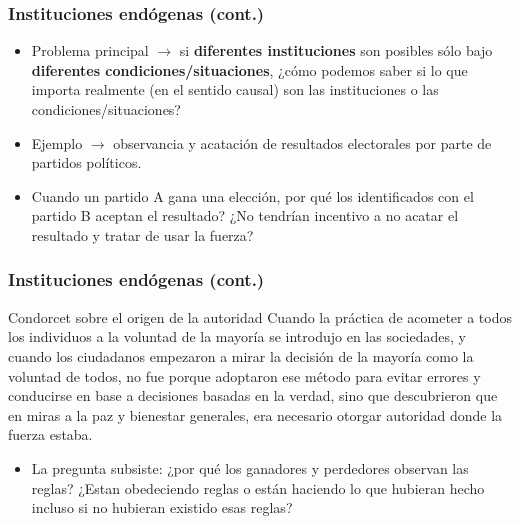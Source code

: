\documentclass[handout,final,xcolor=dvipsnames]{beamer}
\begin{document}
\begin{frame}\frametitle{Instituciones endógenas (cont.)}
\begin{itemize}\itemsep 15pt
\item Problema principal $\longrightarrow$ si \textbf{diferentes
    instituciones} son posibles sólo bajo \textbf{diferentes
    condiciones/situaciones}, ¿cómo podemos saber si lo que importa
  realmente (en el sentido causal) son las instituciones o las
  condiciones/situaciones?
  \item Ejemplo $\longrightarrow$ observancia y acatación de
    resultados electorales por parte de partidos políticos.
    \item Cuando un partido A gana una elección, por qué los
      identificados con el partido B aceptan el resultado? ¿No tendrían
      incentivo a no acatar el resultado y tratar de usar la fuerza?
\end{itemize}
\end{frame}


\begin{frame}\frametitle{Instituciones endógenas (cont.)}
\begin{block}{Condorcet sobre el origen de la autoridad}
Cuando la práctica de acometer a todos los individuos a la
  voluntad de la mayoría se introdujo en las sociedades, y cuando los
  ciudadanos empezaron a mirar la decisión de la mayoría como la
  voluntad de todos, no fue porque adoptaron ese método para evitar
  errores y conducirse en base a decisiones basadas en la verdad, sino
  que descubrieron que en miras a la paz y bienestar generales, era
  necesario otorgar autoridad donde la fuerza estaba.
\end{block}
\begin{itemize}
\item La pregunta subsiste: ¿por qué los ganadores y perdedores
  observan las reglas? ¿Estan obedeciendo reglas o están haciendo lo
  que hubieran hecho incluso si no hubieran existido esas reglas?
  \end{itemize}
\end{frame}
\end{document}
